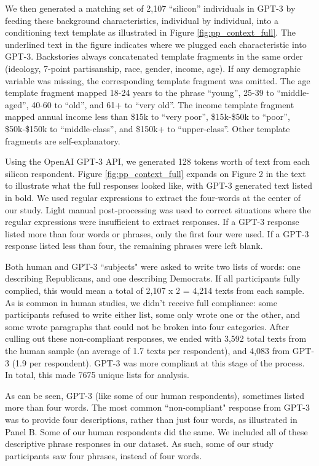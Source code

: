 \documentclass[11pt]{article}
\begin{document}
We then generated a matching set of 2,107 ``silicon'' individuals in GPT-3 by feeding these background characteristics, individual by individual, into a conditioning text template as illustrated in Figure \ref{fig:pp_context_full}. The underlined text in the figure indicates where we plugged each characteristic into GPT-3.
Backstories always concatenated template fragments in the same order (ideology, 7-point partisanship, race, gender, income, age).  If any demographic variable was missing, the corresponding template fragment was omitted.
The age template fragment mapped 18-24 years to the phrase ``young'', 25-39 to ``middle-aged'', 40-60 to ``old'', and 61+ to ``very old''.  The income template fragment mapped annual income less than \$15k to ``very poor'', \$15k-\$50k to ``poor'', \$50k-\$150k to ``middle-class'', and \$150k+ to ``upper-class''.  Other template fragments are self-explanatory.

Using the OpenAI GPT-3 API, we generated 128 tokens worth of text from each silicon respondent. Figure  \ref{fig:pp_context_full} expands on Figure 2 in the text to illustrate what the full responses looked like, with GPT-3 generated text listed in bold. We used regular expressions to extract the four-words at the center of our study.  Light manual post-processing was used to correct situations where the regular expressions were insufficient to extract responses.  If a GPT-3 response listed more than four words or phrases, only the first four were used.  If a GPT-3 response listed less than four, the remaining phrases were left blank.

Both human and GPT-3 ``subjects" were asked to write two lists of words: one describing Republicans, and one describing Democrats. If all participants fully complied, this would mean a total of 2,107 x 2 = 4,214 texts from each sample. As is common in human studies, we didn't receive full compliance: some participants refused to write either list, some only wrote one or the other, and some wrote paragraphs that could not be broken into four categories. After culling out these non-compliant responses, we ended with 3,592 total texts from the human sample (an average of 1.7 texts per respondent), and 4,083 from GPT-3 (1.9 per respondent). GPT-3 was more compliant at this stage of the process. In total, this made 7675 unique lists for analysis.

As can be seen, GPT-3 (like some of our human respondents), sometimes listed more than four words. The most common ``non-compliant" response from GPT-3 was to provide four descriptions, rather than just four words, as illustrated in Panel B. Some of our human respondents did the same. We included all of these descriptive phrase responses in our dataset. As such, some of our study participants saw four phrases, instead of four words.
\end{document}
